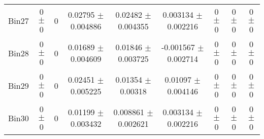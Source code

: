 \begin{tabular}{@{\extracolsep{4pt}}lcccccccc@{}}
     Bin27 & 0 $\pm$ 0 & 0 & 0.02795 $\pm$ 0.004886 & 0.02482 $\pm$ 0.004355 & 0.003134 $\pm$ 0.002216 & 0 $\pm$ 0 & 0 $\pm$ 0 & 0 $\pm$ 0 \\ 
     Bin28 & 0 $\pm$ 0 & 0 & 0.01689 $\pm$ 0.004609 & 0.01846 $\pm$ 0.003725 & -0.001567 $\pm$ 0.002714 & 0 $\pm$ 0 & 0 $\pm$ 0 & 0 $\pm$ 0 \\ 
     Bin29 & 0 $\pm$ 0 & 0 & 0.02451 $\pm$ 0.005225 & 0.01354 $\pm$ 0.00318 & 0.01097 $\pm$ 0.004146 & 0 $\pm$ 0 & 0 $\pm$ 0 & 0 $\pm$ 0 \\ 
     Bin30 & 0 $\pm$ 0 & 0 & 0.01199 $\pm$ 0.003432 & 0.008861 $\pm$ 0.002621 & 0.003134 $\pm$ 0.002216 & 0 $\pm$ 0 & 0 $\pm$ 0 & 0 $\pm$ 0 \\ 
\hline\hline
  \end{tabular}
